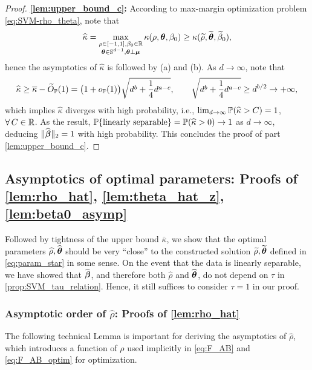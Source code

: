 \begin{proof}
\vspace{0.5\baselineskip}
\noindent
\textbf{\ref{lem:upper_bound_c}:}
According to max-margin optimization problem \cref{eq:SVM-rho_theta}, note that
\begin{equation*}
    \hat\kappa = 
    \max_{ \substack{ \rho \in [-1, 1],  \beta_0 \in \R
    \\
    \vtheta \in \S^{d-1}, \vtheta \perp \vmu } } \kappa(\rho, \vtheta, \beta_0)
    \ge \kappa(\wt\rho, \wt\vtheta, \wt\beta_0),
\end{equation*}
hence the asymptotics of $\hat\kappa$ is followed by (a) and (b). As $d \to \infty$, note that
\begin{equation*}
    \hat\kappa \ge \bar\kappa - \wt O_\P(1)
    = \bigl(1 + o_\P(1)\bigr) \sqrt{  d^{b} +  \frac{1}{4} d^{a-c} },
    \qquad
    \sqrt{  d^{b} +  \frac{1}{4} d^{a-c} } \ge d^{b/2} \to + \infty,
\end{equation*}
which implies $\hat\kappa$ diverges with high probability, i.e., $\lim_{d \to \infty} \P(\hat\kappa > C) = 1$, $\forall\, C \in \R$. As the result, $\P\{\text{linearly separable}\} = \P(\hat\kappa > 0) \to 1$ as $d \to \infty$, deducing $\|\hat\vbeta\|_2 = 1$ with high probability. This concludes the proof of part \ref{lem:upper_bound_c}.
\end{proof}


\subsection{Asymptotics of optimal parameters: Proofs of \cref{lem:rho_hat}, \ref{lem:theta_hat_z}, \ref{lem:beta0_asymp}}
\label{subsec:highimb_asymp}

Followed by tightness of the upper bound $\bar\kappa$, we show that the optimal parameters $\hat\rho, \hat\vtheta$ should be very ``close'' to the constructed solution $\wt\rho, \wt\vtheta$ defined in \cref{eq:param_star} in some sense. On the event that the data is linearly separable, we have showed that $\hat\vbeta$, and therefore both $\hat\rho$ and $\hat\vtheta$, do not depend on $\tau$ in \cref{prop:SVM_tau_relation}. Hence, it still suffices to consider $\tau = 1$ in our proof.


\subsubsection{Asymptotic order of $\hat\rho$: Proofs of \cref{lem:rho_hat}}

The following technical Lemma is important for deriving the asymptotics of $\hat\rho$, which introduces a function of $\rho$ used implicitly in \cref{eq:F_AB} and \eqref{eq:F_AB_optim} for optimization.


